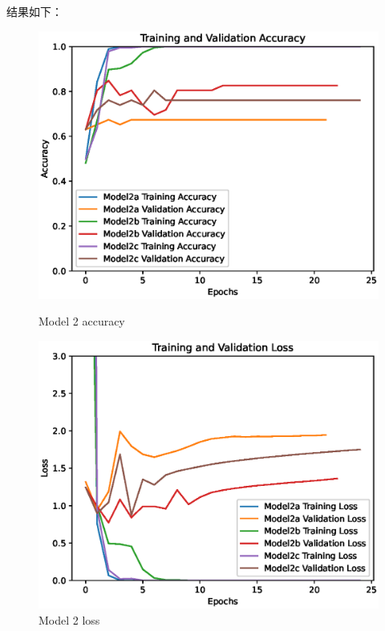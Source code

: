 结果如下：
\begin{figure}
    \centering
    \begin{minipage}{0.49\textwidth}
        \centering
        \includegraphics[width=\textwidth]{./fig/model2/accuracy22.eps}
        \caption{Model 2 accuracy}
        \label{fig:model22_acc}
    \end{minipage}
    \begin{minipage}{0.49\textwidth}
        \centering
        \includegraphics[width=\textwidth]{./fig/model2/loss22.eps}
        \caption{Model 2 loss}
        \label{fig:model22_loss}
    \end{minipage}
\end{figure}


